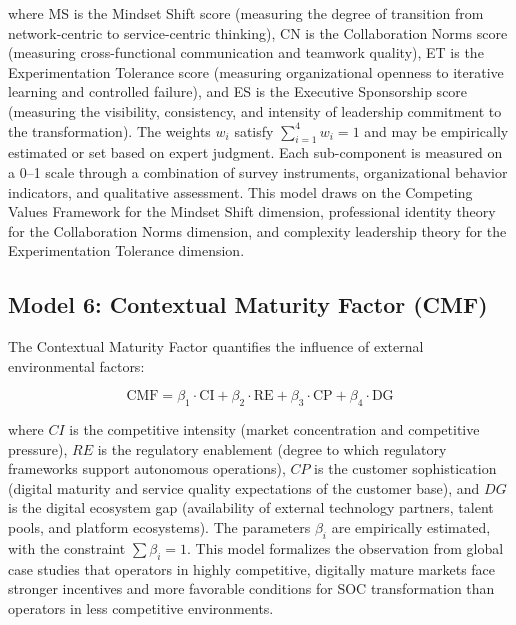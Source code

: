 \documentclass[12pt,a4paper]{article}
\begin{document}
\noindent where MS is the Mindset Shift score (measuring the degree of transition from network-centric to service-centric thinking), CN is the Collaboration Norms score (measuring cross-functional communication and teamwork quality), ET is the Experimentation Tolerance score (measuring organizational openness to iterative learning and controlled failure), and ES is the Executive Sponsorship score (measuring the visibility, consistency, and intensity of leadership commitment to the transformation). The weights $w_i$ satisfy $\sum_{i=1}^{4} w_i = 1$ and may be empirically estimated or set based on expert judgment. Each sub-component is measured on a 0--1 scale through a combination of survey instruments, organizational behavior indicators, and qualitative assessment. This model draws on the Competing Values Framework \citep{cameron2006diagnosing} for the Mindset Shift dimension, professional identity theory \citep{pratt2006constructing} for the Collaboration Norms dimension, and complexity leadership theory \citep{uhl2007complexity} for the Experimentation Tolerance dimension.

\subsection{Model 6: Contextual Maturity Factor (CMF)}

The Contextual Maturity Factor quantifies the influence of external environmental factors:

\begin{equation}
\text{CMF} = \beta_1 \cdot \text{CI} + \beta_2 \cdot \text{RE} + \beta_3 \cdot \text{CP} + \beta_4 \cdot \text{DG}
\label{eq:cmf}
\end{equation}

\noindent where $CI$ is the competitive intensity (market concentration and competitive pressure), $RE$ is the regulatory enablement (degree to which regulatory frameworks support autonomous operations), $CP$ is the customer sophistication (digital maturity and service quality expectations of the customer base), and $DG$ is the digital ecosystem gap (availability of external technology partners, talent pools, and platform ecosystems). The parameters $\beta_i$ are empirically estimated, with the constraint $\sum \beta_i = 1$. This model formalizes the observation from global case studies that operators in highly competitive, digitally mature markets face stronger incentives and more favorable conditions for SOC transformation than operators in less competitive environments.
\end{document}
